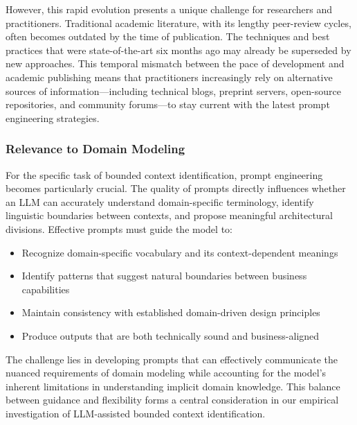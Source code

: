 However, this rapid evolution presents a unique challenge for researchers and practitioners. Traditional academic literature, with its lengthy peer-review cycles, often becomes outdated by the time of publication. The techniques and best practices that were state-of-the-art six months ago may already be superseded by new approaches. This temporal mismatch between the pace of development and academic publishing means that practitioners increasingly rely on alternative sources of information—including technical blogs, preprint servers, open-source repositories, and community forums—to stay current with the latest prompt engineering strategies.

\subsubsection{Relevance to Domain Modeling}
For the specific task of bounded context identification, prompt engineering becomes particularly crucial. The quality of prompts directly influences whether an LLM can accurately understand domain-specific terminology, identify linguistic boundaries between contexts, and propose meaningful architectural divisions. Effective prompts must guide the model to:

\begin{itemize}
    \item Recognize domain-specific vocabulary and its context-dependent meanings
    \item Identify patterns that suggest natural boundaries between business capabilities
    \item Maintain consistency with established domain-driven design principles
    \item Produce outputs that are both technically sound and business-aligned
\end{itemize}

The challenge lies in developing prompts that can effectively communicate the nuanced requirements of domain modeling while accounting for the model's inherent limitations in understanding implicit domain knowledge. This balance between guidance and flexibility forms a central consideration in our empirical investigation of LLM-assisted bounded context identification.
